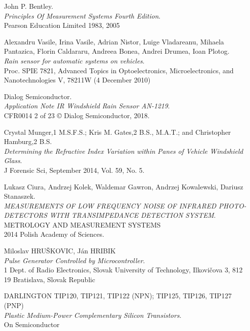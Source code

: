 \documentclass[conference, 11pt]{IEEEtran}
\begin{document}
\begin{thebibliography}{22}


John P. Bentley. \\
\textit{Principles Of Measurement Systems Fourth Edition}. \\
Pearson Education Limited 1983, 2005



Alexandru Vasile, Irina Vasile, Adrian Nistor, Luige Vladareanu, Mihaela Pantazica, Florin Caldararu, Andreea Bonea, Andrei Drumea, Ioan Plotog.\\
\textit{Rain sensor for automatic systems on vehicles}. \\
Proc. SPIE 7821, Advanced Topics in Optoelectronics, Microelectronics, and Nanotechnologies V, 78211W (4 December 2010)

Dialog Semiconductor. \\
\textit{Application Note IR Windshield Rain Sensor AN-1219}. \\
CFR0014 2 of 23 © Dialog Semiconductor, 2018.


Crystal Munger,1 M.S.F.S.; Kris M. Gates,2 B.S., M.A.T.; and Christopher Hamburg,2 B.S. \\
\textit{Determining the Refractive Index Variation within Panes of Vehicle Windshield Glass}. \\
J Forensic Sci, September 2014, Vol. 59, No. 5.



Lukasz Ciura, Andrzej Kolek, Waldemar Gawron, Andrzej Kowalewski, Dariusz Stanaszek.\\
\textit{MEASUREMENTS OF LOW FREQUENCY NOISE OF INFRARED PHOTO- DETECTORS WITH TRANSIMPEDANCE DETECTION SYSTEM}. \\
METROLOGY AND MEASUREMENT SYSTEMS\\
2014 Polish Academy of Sciences.



Miloslav HRUŠKOVIC, Ján HRIBIK \\
\textit{Pulse Generator Controlled by Microcontroller}. \\
1 Dept. of Radio Electronics, Slovak University of Technology, Ilkovičova 3, 812 19 Bratislava, Slovak Republic


DARLINGTON TIP120, TIP121, TIP122 (NPN); TIP125, TIP126, TIP127 (PNP)\\
\textit{Plastic Medium-Power Complementary Silicon Transistors}. \\
On Semiconductor



\end{thebibliography}
\end{document}
